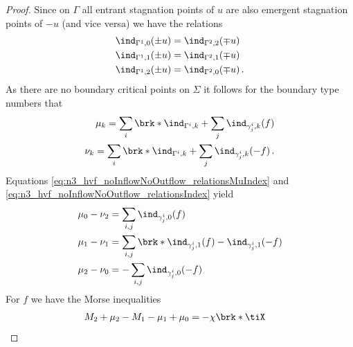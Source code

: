 \begin{proof}
  Since on $\Gamma$ all entrant stagnation points of $u$ are also emergent
  stagnation points of $-u$ (and vice versa) we have the relations
  \begin{equation}
    \begin{aligned}
    \ind_{\Gamma^1,0}(\pm u)&=\ind_{\Gamma^2,2}(\mp u) \\
    \ind_{\Gamma^1,1}(\pm u)&=\ind_{\Gamma^2,1}(\mp u) \\
    \ind_{\Gamma^1,2}(\pm u)&=\ind_{\Gamma^2,0}(\mp u)\,.
    \end{aligned}\label{eq:n3_hvf_noInflowNoOutflow_relationsIndex}
  \end{equation}
  As there are no boundary critical points on $\Sigma$ it follows for the 
  boundary type numbers that
  \begin{equation}
    \begin{aligned}
    \mu_k=\sum_i\brk*{\ind_{\Gamma^i,k}+\sum_j\ind_{\gamma_j^i,k}}(f) \\
    \nu_k=\sum_i\brk*{\ind_{\Gamma^i,k}+\sum_j\ind_{\gamma_j^i,k}}(-f)\,.
    \end{aligned}\label{eq:n3_hvf_noInflowNoOutflow_relationsMuIndex}
  \end{equation}
  Equations \eqref{eq:n3_hvf_noInflowNoOutflow_relationsMuIndex} and \eqref{eq:n3_hvf_noInflowNoOutflow_relationsIndex}
  yield
  \begin{equation}
    \begin{aligned}
    \mu_0-\nu_2&=\sum_{i,j}\ind_{\gamma_j^i,0}(f) \\
    \mu_1-\nu_1&=\sum_{i,j}\brk*{\ind_{\gamma_j^i,1}(f)-\ind_{\gamma_j^i,1}(-f)} \\
    \mu_2-\nu_0&=-\sum_{i,j}\ind_{\gamma_j^i,0}(-f)
    \end{aligned}
    \label{eq:n3_hvf_noInflowNoOutflow_relationsMuNu}
  \end{equation}
  For $f$ we have the Morse inequalities
  \begin{align}
    M_2+\mu_2-M_1-\mu_1+\mu_0&=-\chi\brk*{\tiX} \label{eq:n3_hvf_MorseInequalities_1}

\end{align}
\end{proof}
